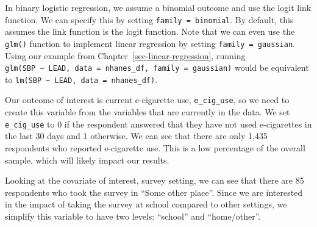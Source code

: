 \documentclass[
  letterpaper,
]{latex/krantz}
\makeatletter
\newenvironment{Shaded}{\begin{snugshade}}{\end{snugshade}}
\newcommand{\CommentTok}[1]{\textcolor[rgb]{0.37,0.37,0.37}{#1}}
\newcommand{\DecValTok}[1]{\textcolor[rgb]{0.68,0.00,0.00}{#1}}
\newcommand{\FunctionTok}[1]{\textcolor[rgb]{0.28,0.35,0.67}{#1}}
\newcommand{\NormalTok}[1]{\textcolor[rgb]{0.00,0.23,0.31}{#1}}
\newcommand{\OtherTok}[1]{\textcolor[rgb]{0.00,0.23,0.31}{#1}}
\newcommand{\SpecialCharTok}[1]{\textcolor[rgb]{0.37,0.37,0.37}{#1}}
\newcommand{\StringTok}[1]{\textcolor[rgb]{0.13,0.47,0.30}{#1}}
\newenvironment{kframe}{%
\medskip{}
\setlength{\fboxsep}{.8em}
 \def\at@end@of@kframe{}%
 \ifinner\ifhmode%
  \def\at@end@of@kframe{\end{minipage}}%
  \begin{minipage}{\columnwidth}%
 \fi\fi%
 \def\FrameCommand##1{\hskip\@totalleftmargin \hskip-\fboxsep
 \colorbox{shadecolor}{##1}\hskip-\fboxsep
     \hskip-\linewidth \hskip-\@totalleftmargin \hskip\columnwidth}%
 \MakeFramed {\advance\hsize-\width
   \@totalleftmargin\z@ \linewidth\hsize
   \@setminipage}}%
 {\par\unskip\endMakeFramed%
 \at@end@of@kframe}
\renewenvironment{Shaded}{\begin{kframe}}{\end{kframe}}
\makeatother
\begin{document}
In binary logistic regression, we assume a binomial outcome and use the
logit link function. We can specify this by setting
\texttt{family\ =\ binomial}. By default, this assumes the link function
is the logit function. Note that we can even use the \texttt{glm()}
function to implement linear regression by setting
\texttt{family\ =\ gaussian}. Using our example from
Chapter~\ref{sec-linear-regression}, running
\texttt{glm(SBP\ \textasciitilde{}\ LEAD,\ data\ =\ nhanes\_df,\ family\ =\ gaussian)}
would be equivalent to
\texttt{lm(SBP\ \textasciitilde{}\ LEAD,\ data\ =\ nhanes\_df)}.

Our outcome of interest is current e-cigarette use,
\texttt{e\_cig\_use}, so we need to create this variable from the
variables that are currently in the data. We set \texttt{e\_cig\_use} to
0 if the respondent answered that they have not used e-cigarettes in the
last 30 days and 1 otherwise. We can see that there are only 1,435
respondents who reported e-cigarette use. This is a low percentage of
the overall sample, which will likely impact our results.

\begin{Shaded}
\end{Shaded}

Looking at the covariate of interest, survey setting, we can see that
there are 85 respondents who took the survey in ``Some other place''.
Since we are interested in the impact of taking the survey at school
compared to other settings, we simplify this variable to have two
levels: ``school'' and ``home/other''.
\end{document}
